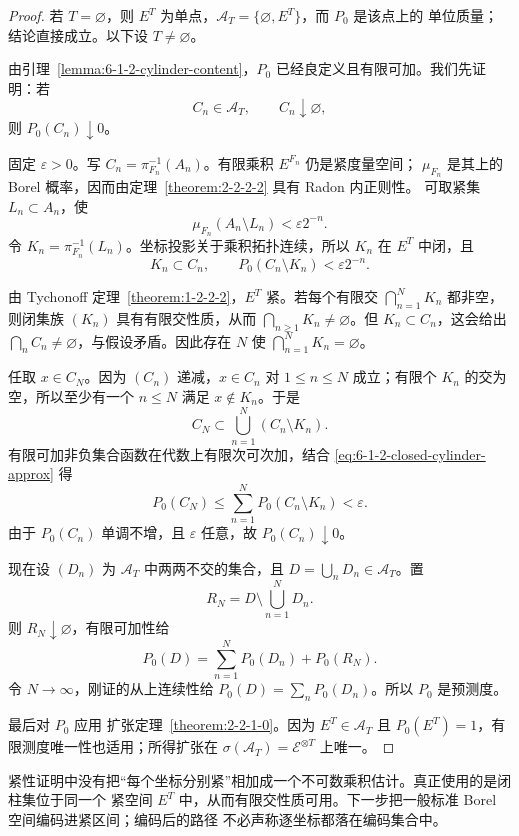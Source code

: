 \begin{proof}
若 $T=\varnothing$，则 $E^T$ 为单点，$\mathcal A_T=\{\varnothing,E^T\}$，而 $P_0$ 是该点上的
单位质量；结论直接成立。以下设 $T\ne\varnothing$。

由引理~\ref{lemma:6-1-2-cylinder-content}，$P_0$ 已经良定义且有限可加。我们先证明：若
\[
  C_n\in\mathcal A_T,\qquad C_n\downarrow\varnothing,
\]
则 $P_0(C_n)\downarrow0$。

固定 $\varepsilon>0$。写 $C_n=\pi_{F_n}^{-1}(A_n)$。有限乘积 $E^{F_n}$ 仍是紧度量空间；
$\mu_{F_n}$ 是其上的 Borel 概率，因而由定理~\ref{theorem:2-2-2-2} 具有 Radon 内正则性。
可取紧集 $L_n\subset A_n$，使
\[
  \mu_{F_n}(A_n\setminus L_n)<\varepsilon2^{-n}.
\]
令 $K_n=\pi_{F_n}^{-1}(L_n)$。坐标投影关于乘积拓扑连续，所以 $K_n$ 在 $E^T$ 中闭，且
\[
      K_n\subset C_n,\qquad
 P_0(C_n\setminus K_n)<\varepsilon2^{-n}.
 \tag{6.1.4}\label{eq:6-1-2-closed-cylinder-approx}
\]

由 Tychonoff 定理~\ref{theorem:1-2-2-2}，$E^T$ 紧。若每个有限交
$\bigcap_{n=1}^NK_n$ 都非空，则闭集族 $(K_n)$ 具有有限交性质，从而
$\bigcap_{n\ge1}K_n\ne\varnothing$。但 $K_n\subset C_n$，这会给出
$\bigcap_nC_n\ne\varnothing$，与假设矛盾。因此存在 $N$ 使
$\bigcap_{n=1}^NK_n=\varnothing$。

任取 $x\in C_N$。因为 $(C_n)$ 递减，$x\in C_n$ 对 $1\le n\le N$ 成立；有限个
$K_n$ 的交为空，所以至少有一个 $n\le N$ 满足 $x\notin K_n$。于是
\[
 C_N\subset\bigcup_{n=1}^N(C_n\setminus K_n).
\]
有限可加非负集合函数在代数上有限次可次加，结合
\eqref{eq:6-1-2-closed-cylinder-approx} 得
\[
  P_0(C_N)
  \le\sum_{n=1}^NP_0(C_n\setminus K_n)
  <\varepsilon.
\]
由于 $P_0(C_n)$ 单调不增，且 $\varepsilon$ 任意，故 $P_0(C_n)\downarrow0$。

现在设 $(D_n)$ 为 $\mathcal A_T$ 中两两不交的集合，且
$D=\bigcup_nD_n\in\mathcal A_T$。置
\[
 R_N=D\setminus\bigcup_{n=1}^ND_n.
\]
则 $R_N\downarrow\varnothing$，有限可加性给
\[
 P_0(D)=\sum_{n=1}^NP_0(D_n)+P_0(R_N).
\]
令 $N\to\infty$，刚证的从上连续性给
$P_0(D)=\sum_nP_0(D_n)$。所以 $P_0$ 是预测度。

最后对 $P_0$ 应用 \Caratheodory{} 扩张定理~\ref{theorem:2-2-1-0}。因为
$E^T\in\mathcal A_T$ 且 $P_0(E^T)=1$，有限测度唯一性也适用；所得扩张在
$\sigma(\mathcal A_T)=\mathcal E^{\otimes T}$ 上唯一。
\end{proof}

紧性证明中没有把“每个坐标分别紧”相加成一个不可数乘积估计。真正使用的是闭柱集位于同一个
紧空间 $E^T$ 中，从而有限交性质可用。下一步把一般标准 Borel 空间编码进紧区间；编码后的路径
不必声称逐坐标都落在编码集合中。

